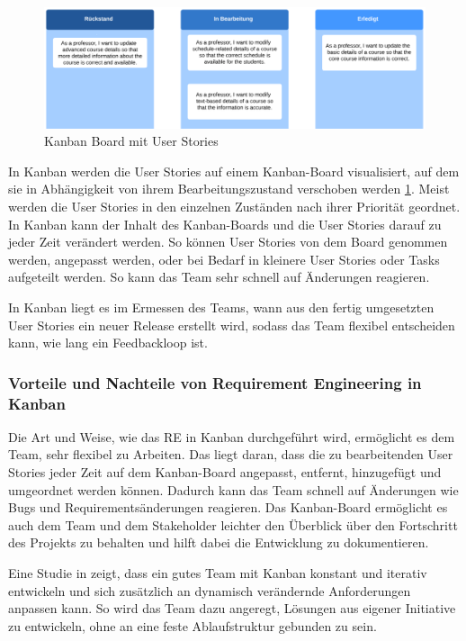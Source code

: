 \documentclass[acmtog]{acmart}
\begin{document}
\begin{figure}[t]
  \centering
  \includegraphics[width=\linewidth]{images/Kanban-Board-mit-userstories.png}
  \caption{Kanban Board mit User Stories}
    \label{fig:kanban-board}
  \Description{}
\end{figure}

In Kanban werden die User Stories auf einem Kanban-Board visualisiert, auf dem sie in Abhängigkeit von 
ihrem Bearbeitungszustand verschoben werden \ref{fig:kanban-board}. Meist werden die User Stories in den einzelnen 
Zuständen nach ihrer Priorität geordnet. In Kanban kann der Inhalt des Kanban-Boards und die User Stories 
darauf zu jeder Zeit verändert werden. So können User Stories von dem Board genommen werden, angepasst 
werden, oder bei Bedarf in kleinere User Stories oder Tasks aufgeteilt werden. So kann das Team sehr schnell 
auf Änderungen reagieren. \cite{agileprocesses}

In Kanban liegt es im Ermessen des Teams, wann aus den fertig umgesetzten User Stories ein neuer Release 
erstellt wird, sodass das Team flexibel entscheiden kann, wie lang ein Feedbackloop ist. \cite{agileprocesses}

\subsubsection{Vorteile und Nachteile von Requirement Engineering in Kanban}

Die Art und Weise, wie das RE in Kanban durchgeführt wird, ermöglicht es dem Team, sehr flexibel zu Arbeiten. 
Das liegt daran, dass die zu bearbeitenden User Stories jeder Zeit auf dem Kanban-Board angepasst, entfernt, 
hinzugefügt und umgeordnet werden können. Dadurch kann das Team schnell auf Änderungen wie Bugs und Requirementsänderungen 
reagieren. Das Kanban-Board ermöglicht es auch dem Team und dem Stakeholder leichter den Überblick über den 
Fortschritt des Projekts zu behalten und hilft dabei die Entwicklung zu dokumentieren.

Eine Studie in \cite{agileprocesses} zeigt, dass ein gutes Team mit Kanban konstant und iterativ entwickeln und sich zusätzlich 
an dynamisch verändernde Anforderungen anpassen kann. So wird das Team dazu angeregt, Lösungen aus eigener 
Initiative zu entwickeln, ohne an eine feste Ablaufstruktur gebunden zu sein. \cite{reqkanban}
\end{document}
